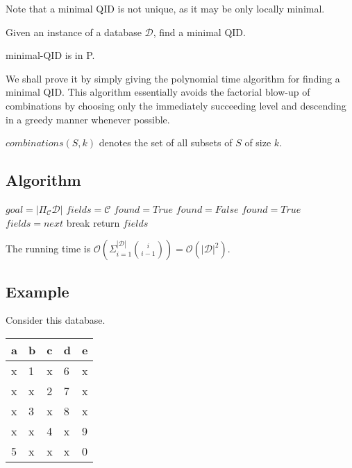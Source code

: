 \documentclass[12pt]{llncs}
\newcommand{\cD}{\mathcal{D}}
\newcommand{\Proj}[1]{\Pi_{#1}}
\begin{document}
Note that a minimal QID is not unique, as it may be only locally minimal.

\begin{problem}
Given an instance of a database $\cD$, find a minimal QID.
\end{problem}

\begin{proposition}
minimal-QID is in P.
\end{proposition}

We shall prove it by simply giving the polynomial time algorithm for finding a minimal QID. This algorithm essentially avoids the factorial blow-up of combinations by choosing only the immediately succeeding level and descending in a greedy manner whenever possible.

$combinations(S,k)$ denotes the set of all subsets of $S$ of size $k$.


\subsection{Algorithm}
\begin{algorithm}[H]
    \DontPrintSemicolon
    \KwData{A database $\cD$.}
    $goal = |\Proj{\mathcal{C}} \mathcal{D}|$\;
    $fields = \mathcal{C}$\;
    $found = True$\;
    {
        $found = False$\;
        {
            \If{$|\Proj{next} \mathcal{D}| = goal$}
            {
                $found = True$\;
                $fields = next$\;
                break\;
            }
        }
    }
    return $fields$\;
\end{algorithm}

The running time is $\mathcal{O}(\Sigma_{i=1}^{|\mathcal{D}|} \binom{i}{i-1}) = \mathcal{O}(|\mathcal{D}|^2)$.

\subsection{Example}
Consider this database.
\begin{center}
    \begin{tabular}{ | M{3em} | M{3em} | M{3em} | M{3em} | M{3em} | }
    \hline
    a & b & c & d & e\\
    \hline
    x & 1 & x & 6 & x\\
    x & x & 2 & 7 & x\\
    x & 3 & x & 8 & x\\
    x & x & 4 & x & 9\\
    5 & x & x & x & 0\\
    \hline
    \end{tabular}
\end{center}
\end{document}
